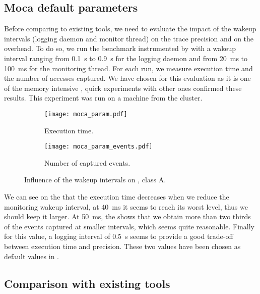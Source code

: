 \subsection{Moca default parameters}
\label{sec:expe-param}

Before comparing \Moca to existing tools, we need to evaluate the impact of
the wakeup intervals (logging daemon and monitor thread) on the trace
precision and on the overhead. To do so, we run the \IS benchmark instrumented by \Moca with
a wakeup interval ranging from \SI{0.1}{s} to  \SI{0.9}{s} for the logging daemon and from \SI{20}{ms} to
\SI{100}{ms} for the monitoring thread. For each run, we measure \IS execution time and the number of
accesses captured. We have chosen \IS for this evaluation as it is one of the memory intensive \NPB,
quick experiments with other ones confirmed these results. This experiment was
run on a machine from the \Edel cluster.

\begin{figure}[htb]
    \centering
    \begin{subfigure}{\linewidth}
        \texttt{[image: moca\_param.pdf]}
        \caption{Execution time.}
        \label{fig:param_time}
    \end{subfigure}
    \begin{subfigure}{\linewidth}
        \texttt{[image: moca\_param\_events.pdf]}
        \caption{Number of captured events.}
        \label{fig:param_evts}
    \end{subfigure}
    \caption{Influence of the wakeup intervals on \IS, class A.}
    \label{fig:param}
\end{figure}

We can see on the  that the execution time decreases when we
reduce the monitoring wakeup interval, at \SI{40}{ms}
it seems to reach its worst level, thus we should keep it larger. At \SI{50}{ms}, the
 shows that we obtain more than two thirds of the events captured
at smaller intervals, which seems quite reasonable. Finally for this value, a logging
interval of \SI{0.5}{s} seems to provide a good trade-off  between
execution time and precision.
These two values have been chosen as default values in \Moca.



\subsection{Comparison with existing tools}
\label{sec:expe-ovh}

